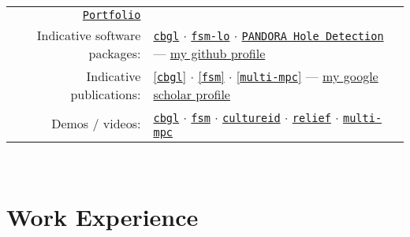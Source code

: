 \documentclass[a4paper,10pt,twoside]{article}
\begin{document}
\vspace{+0.1cm}
\begin{tabular}{rl}
  \href{https://docs.google.com/viewer?url=https://raw.githubusercontent.com/li9i/portfolio/master/portfolio.pdf}{\texttt{Portfolio}} &\\

  Indicative software packages: &
  \href{https://github.com/li9i/cbgl}{\texttt{cbgl}} $\cdot$
  \href{https://github.com/li9i/fsm-lo}{\texttt{fsm-lo}} $\cdot$
  \href{https://github.com/li9i/pandora\_vision\_2014/tree/hydro-devel/pandora\_vision\_hole\_detector}{\texttt{PANDORA Hole Detection}} \hspace{1em} --- \href{https://github.com/li9i}{my github profile}\\

  Indicative publications: &
  \href{https://ieeexplore.ieee.org/abstract/document/10802235}{[\texttt{cbgl}]} $\cdot$
  \href{https://ieeexplore.ieee.org/abstract/document/9981228}{[\texttt{fsm}]} $\cdot$
  \href{https://www.tandfonline.com/doi/full/10.1080/00207179.2018.1514129}{[\texttt{multi-mpc}]} \hspace{4.4em} --- \href{https://scholar.google.com/citations?hl=en&user=9_hI4hMAAAAJ&view_op=list_works&sortby=pubdate}{my google scholar profile}\\

  Demos / videos: & \href{https://www.youtube.com/watch?v=xaDKjI0WkDc}{\texttt{cbgl}} $\cdot$ \href{https://www.youtube.com/watch?v=hB4qsHCEXGI}{\texttt{fsm}} $\cdot$ \href{https://cultureid.web.auth.gr/?page\_id=200&lang=en}{\texttt{cultureid}} $\cdot$ \href{https://relief.web.auth.gr/}{\texttt{relief}} $\cdot$ \href{https://www.youtube.com/watch?v=937OZez1iN8}{\texttt{multi-mpc}}
\end{tabular}\\


\section{Work Experience}
\end{document}
